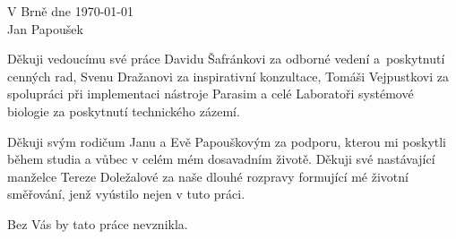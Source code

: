 \documentclass[11pt,twoside,utf8,final]{fithesis} %
\theoremstyle{plain}
\theoremstyle{definition}
\begin{document}
\FrontMatter
\ThesisTitlePage

\begin{ThesisDeclaration}
\DeclarationText

\medskip
\begin{flushright}
\begin{minipage}{0.36\textwidth}
V Brně dne \today\\
Jan Papoušek
\end{minipage}
\end{flushright}

\AdvisorName
\end{ThesisDeclaration}

\begin{ThesisThanks}
Děkuji vedoucímu své práce Davidu Šafránkovi za odborné vedení
a~pos\-kyt\-nu\-tí cenných rad, Svenu Dražanovi za inspirativní konzultace, Tomáši Vejpustkovi za spolupráci 
při implementaci nástroje Parasim a celé Laboratoři sys\-té\-mo\-vé biologie za poskytnutí
technického zázemí.

\vspace{0.5cm}
\noindent
Děkuji svým rodičum Janu a Evě Papouškovým za podporu, kterou mi poskytli během studia a vůbec v celém
mém dosavadním životě. Děkuji své nastávající manželce Tereze Doležalové za naše dlouhé
rozpravy formující mé životní směřování, jenž vy\-ústi\-lo nejen v tuto práci.

\vspace{0.5cm}
\noindent
Bez Vás by tato práce nevznikla.

\end{ThesisThanks}
\end{document}
